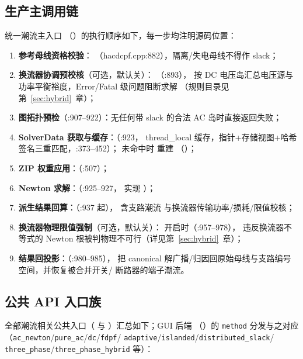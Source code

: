 \subsection{生产主调用链}
统一潮流主入口 
（）的执行顺序如下，每一步均注明源码位置：

\begin{enumerate}
  \item \textbf{参考母线资格校验}：
        （hacdcpf.cpp:882），隔离/失电母线不得作 slack；
  \item \textbf{换流器协调预校核}（可选，默认关）：
        （:893），
        按 DC 电压岛汇总电压源与功率平衡裕度，Error/Fatal 级问题阻断求解
        （规则目录见第~\ref{sec:hybrid}~章）；
  \item \textbf{图拓扑预检}（:907--922）：无任何带 slack 的合法 AC 岛时直接返回失败；
  \item \textbf{SolverData 获取与缓存}：（:923，
        thread\_local 缓存，指针+存储视图+哈希签名三重匹配，:373--452）；
        未命中时  重建
        （）；
  \item \textbf{ZIP 权重应用}：（:507）；
  \item \textbf{Newton 求解}：（:925--927，
        实现 ）；
  \item \textbf{派生结果回算}：（:937 起），
        含支路潮流  与换流器传输功率/损耗/限值校核；
  \item \textbf{换流器物理限值强制}（可选，默认关）：
         开启时（:957--978），
        违反换流器不等式的 Newton 根被判物理不可行（详见第~\ref{sec:hybrid}~章）；
  \item \textbf{结果回投影}：（:980--985），
        把 canonical 解广播/归因回原始母线与支路编号空间，并恢复被合并开关/
        断路器的端子潮流。
\end{enumerate}

\subsection{公共 API 入口族}
全部潮流相关公共入口（ 与
）汇总如下；GUI 后端
（）的 \texttt{method} 分发与之对应
（\texttt{ac\_newton}/\allowbreak\texttt{pure\_ac}/\allowbreak\texttt{dc}/\allowbreak\texttt{fdpf}/
\texttt{adaptive}/\allowbreak\texttt{islanded}/\allowbreak\texttt{distributed\_slack}/
\texttt{three\_phase}/\texttt{three\_phase\_hybrid} 等）：

